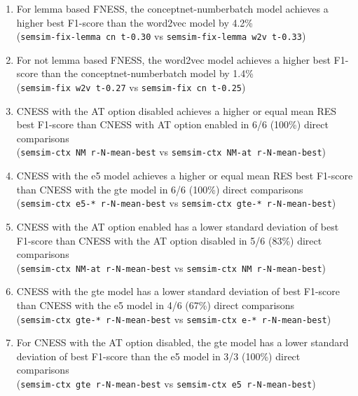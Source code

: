 \documentclass[11pt]{scrreprt}
\begin{document}
\begin{enumerate}
	\item For lemma based FNESS, the conceptnet-numberbatch model achieves a higher best F1-score than the word2vec model by 4.2\% \\ (\texttt{semsim-fix-lemma cn t-0.30} vs \texttt{semsim-fix-lemma w2v t-0.33})
	\item For not lemma based FNESS, the word2vec model achieves a higher best F1-score than the conceptnet-numberbatch model by 1.4\% \\ (\texttt{semsim-fix w2v t-0.27} vs \texttt{semsim-fix cn t-0.25})
	\item CNESS with the AT option disabled achieves a higher or equal mean RES best F1-score than CNESS with AT option enabled in 6/6 (100\%) direct comparisons \\(\texttt{semsim-ctx NM r-N-mean-best} vs \texttt{semsim-ctx NM-at r-N-mean-best})
	\item CNESS with the e5 model achieves a higher or equal mean RES best F1-score than CNESS with the gte model in 6/6 (100\%) direct comparisons \\ (\texttt{semsim-ctx e5-* r-N-mean-best} vs \texttt{semsim-ctx gte-* r-N-mean-best})
	\item CNESS with the AT option enabled has a lower standard deviation of best F1-score than CNESS with the AT option disabled in 5/6 (83\%) direct comparisons \\ (\texttt{semsim-ctx NM-at r-N-mean-best} vs \texttt{semsim-ctx NM r-N-mean-best})
	\item CNESS with the gte model has a lower standard deviation of best F1-score than CNESS with the e5 model in 4/6 (67\%) direct comparisons \\ (\texttt{semsim-ctx gte-* r-N-mean-best} vs \texttt{semsim-ctx e-* r-N-mean-best})
	\item For CNESS with the AT option disabled, the gte model has a lower standard deviation of best F1-score than the e5 model in 3/3 (100\%) direct comparisons \\ (\texttt{semsim-ctx gte r-N-mean-best} vs \texttt{semsim-ctx e5 r-N-mean-best})
\end{enumerate}
\end{document}
